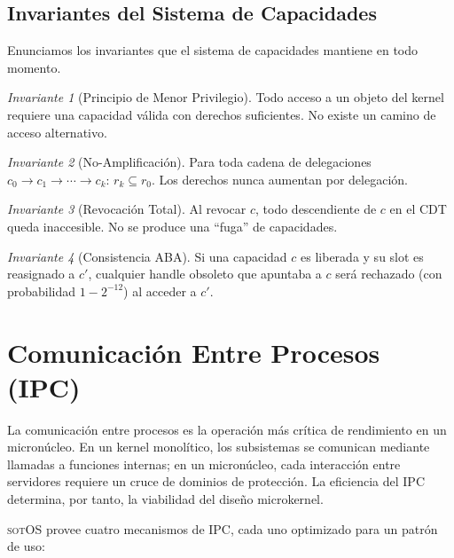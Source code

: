 \documentclass[11pt,twoside,openright]{book}
\theoremstyle{definition}
\theoremstyle{plain}
\theoremstyle{remark}
\newtheorem{invariant}{Invariante}[chapter]
\newcommand{\sotos}{\textsc{sotOS}}
\begin{document}
\section{Invariantes del Sistema de Capacidades}

Enunciamos los invariantes que el sistema de capacidades mantiene en todo momento.

\begin{invariant}[Principio de Menor Privilegio]
\label{inv:least-privilege}
Todo acceso a un objeto del kernel requiere una capacidad válida con derechos suficientes.
No existe un camino de acceso alternativo.
\end{invariant}

\begin{invariant}[No-Amplificación]
\label{inv:no-amplification}
Para toda cadena de delegaciones $c_0 \to c_1 \to \cdots \to c_k$:
$r_k \subseteq r_0$. Los derechos nunca aumentan por delegación.
\end{invariant}

\begin{invariant}[Revocación Total]
\label{inv:total-revocation}
Al revocar $c$, todo descendiente de $c$ en el CDT queda inaccesible. No se produce
una ``fuga'' de capacidades.
\end{invariant}

\begin{invariant}[Consistencia ABA]
\label{inv:aba-consistency}
Si una capacidad $c$ es liberada y su slot es reasignado a $c'$, cualquier handle
obsoleto que apuntaba a $c$ será rechazado (con probabilidad $1 - 2^{-12}$) al
acceder a $c'$.
\end{invariant}


\chapter{Comunicación Entre Procesos (IPC)}
\label{chap:ipc}

La comunicación entre procesos es la operación más crítica de rendimiento en un
micronúcleo. En un kernel monolítico, los subsistemas se comunican mediante llamadas
a funciones internas; en un micronúcleo, cada interacción entre servidores requiere
un cruce de dominios de protección. La eficiencia del IPC determina, por tanto, la
viabilidad del diseño microkernel.

\sotos{} provee cuatro mecanismos de IPC, cada uno optimizado para un patrón de uso:
\end{document}
